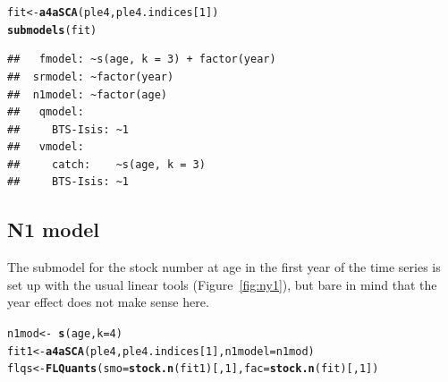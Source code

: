 \documentclass[a4paper,english,10pt]{article}\usepackage[]{graphicx}\usepackage[]{color}
\makeatletter
\newcommand{\hlnum}[1]{\textcolor[rgb]{0.686,0.059,0.569}{#1}}%
\newcommand{\hlopt}[1]{\textcolor[rgb]{0,0,0}{#1}}%
\newcommand{\hlstd}[1]{\textcolor[rgb]{0.345,0.345,0.345}{#1}}%
\newcommand{\hlkwb}[1]{\textcolor[rgb]{0.69,0.353,0.396}{#1}}%
\newcommand{\hlkwc}[1]{\textcolor[rgb]{0.333,0.667,0.333}{#1}}%
\newcommand{\hlkwd}[1]{\textcolor[rgb]{0.737,0.353,0.396}{\textbf{#1}}}%
\newenvironment{kframe}{%
 \def\at@end@of@kframe{}%
 \ifinner\ifhmode%
  \def\at@end@of@kframe{\end{minipage}}%
  \begin{minipage}{\columnwidth}%
 \fi\fi%
 \def\FrameCommand##1{\hskip\@totalleftmargin \hskip-\fboxsep
 \colorbox{shadecolor}{##1}\hskip-\fboxsep
     \hskip-\linewidth \hskip-\@totalleftmargin \hskip\columnwidth}%
 \MakeFramed {\advance\hsize-\width
   \@totalleftmargin\z@ \linewidth\hsize
   \@setminipage}}%
 {\par\unskip\endMakeFramed%
 \at@end@of@kframe}
\newenvironment{knitrout}{}{} %
\makeatother
\begin{document}
\begin{knitrout}
\color{fgcolor}\begin{kframe}
\begin{alltt}
\hlstd{fit} \hlkwb{<-} \hlkwd{a4aSCA}\hlstd{(ple4, ple4.indices[}\hlnum{1}\hlstd{])}
\hlkwd{submodels}\hlstd{(fit)}
\end{alltt}
\begin{verbatim}
## 	 fmodel: ~s(age, k = 3) + factor(year)
## 	srmodel: ~factor(year)
## 	n1model: ~factor(age)
## 	 qmodel:
## 	   BTS-Isis: ~1
## 	 vmodel:
## 	   catch:    ~s(age, k = 3)
## 	   BTS-Isis: ~1
\end{verbatim}
\end{kframe}
\end{knitrout}

\subsection{N1 model}

The submodel for the stock number at age in the first year of the time series is set up with the usual linear tools (Figure~\ref{fig:ny1}), but bare in mind that the year effect does not make sense here.

\begin{knitrout}
\color{fgcolor}\begin{kframe}
\begin{alltt}
\hlstd{n1mod} \hlkwb{<-} \hlopt{~}\hlkwd{s}\hlstd{(age,} \hlkwc{k} \hlstd{=} \hlnum{4}\hlstd{)}
\hlstd{fit1} \hlkwb{<-} \hlkwd{a4aSCA}\hlstd{(ple4, ple4.indices[}\hlnum{1}\hlstd{],} \hlkwc{n1model} \hlstd{= n1mod)}
\hlstd{flqs} \hlkwb{<-} \hlkwd{FLQuants}\hlstd{(}\hlkwc{smo} \hlstd{=} \hlkwd{stock.n}\hlstd{(fit1)[,} \hlnum{1}\hlstd{],} \hlkwc{fac} \hlstd{=} \hlkwd{stock.n}\hlstd{(fit)[,} \hlnum{1}\hlstd{])}
\end{alltt}
\end{kframe}
\end{knitrout}
\end{document}
